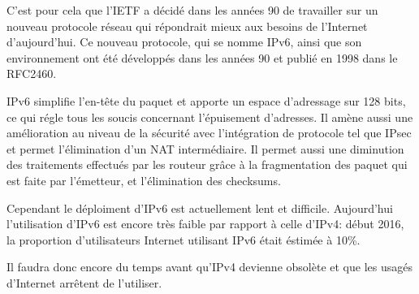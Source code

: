 \smallbreak
C'est pour cela que l'IETF a décidé dans les années 90 de travailler sur un
nouveau protocole réseau qui répondrait mieux aux besoins de l'Internet
d'aujourd'hui. Ce nouveau protocole, qui se nomme IPv6, ainsi que son
environnement ont été développés dans les années 90 et publié en 1998 dans le
RFC2460\cite{url-RFC-IPV6}. 

\smallbreak
IPv6 simplifie l'en-tête du paquet et apporte un espace d'adressage sur 128
bits, ce qui régle tous les soucis concernant l'épuisement d'adresses.  Il
amène aussi une amélioration au niveau de la sécurité avec l'intégration de protocole
tel que IPsec et permet l'élimination d'un NAT intermédiaire. Il permet aussi
une diminution des traitements effectués par les routeur grâce à la
fragmentation des paquet qui est faite par l'émetteur, et l'élimination des checksums.


Cependant le déploiment d'IPv6 est actuellement lent et
difficile. Aujourd'hui l'utilisation d'IPv6 est encore très faible par rapport à
celle d'IPv4: début 2016, la proportion d'utilisateurs Internet utilisant IPv6
était éstimée à 10\%. 

\smallbreak

Il faudra donc encore du temps avant qu'IPv4 devienne obsolète et que les usagés d'Internet
arrêtent de l'utiliser.

